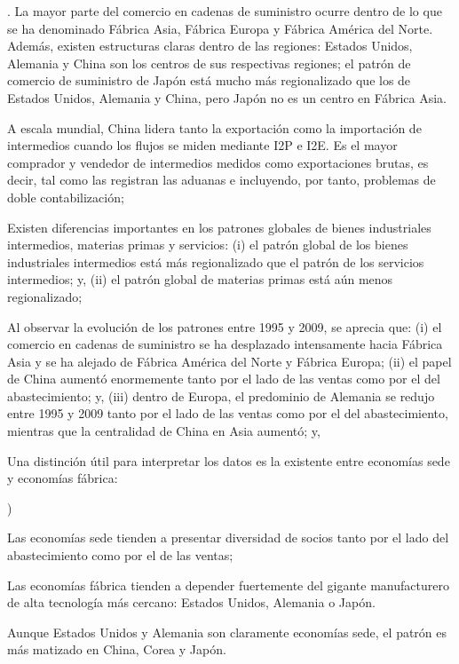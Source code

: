 \documentclass[10pt,a4paper]{article}
\newcounter{alphaitem}
\newcounter{numitem}
\newenvironment{la}
      {\begin{list}{\alph{alphaitem})}{%
          \usecounter{alphaitem}%
          \setlength{\leftmargin}{1cm}%
          \setlength{\parskip}{3pt}%
          \setlength{\itemsep}{0pt}%
          \setlength{\parsep}{0pt}%
      }}
      {\end{list}}
\newenvironment{lnum}
      {\begin{list}{\arabic{numitem}.}{%
          \usecounter{numitem}%
          \setlength{\leftmargin}{1cm}%
          \setlength{\parskip}{3pt}%
          \setlength{\itemsep}{0pt}%
          \setlength{\parsep}{0pt}%
      }}
      {\end{list}}
\begin{document}
\begin{lnum}
{        La mayor parte del comercio en cadenas de suministro ocurre dentro de lo que se ha denominado Fábrica Asia, Fábrica Europa y Fábrica América del Norte. Además, existen estructuras claras dentro de las regiones: Estados Unidos, Alemania y China son los centros de sus respectivas regiones; el patrón de comercio de suministro de Japón está mucho más regionalizado que los de Estados Unidos, Alemania y China, pero Japón no es un centro en Fábrica Asia.
    }
    \item A escala mundial, China lidera tanto la exportación como la importación de intermedios cuando los flujos se miden mediante I2P e I2E. Es el mayor comprador y vendedor de intermedios medidos como exportaciones brutas, es decir, tal como las registran las aduanas e incluyendo, por tanto, problemas de doble contabilización;
    \item Existen diferencias importantes en los patrones globales de bienes industriales intermedios, materias primas y servicios: (i) el patrón global de los bienes industriales intermedios está más regionalizado que el patrón de los servicios intermedios; y, (ii) el patrón global de materias primas está aún menos regionalizado;
    \item Al observar la evolución de los patrones entre 1995 y 2009, se aprecia que: (i) el comercio en cadenas de suministro se ha desplazado intensamente hacia Fábrica Asia y se ha alejado de Fábrica América del Norte y Fábrica Europa; (ii) el papel de China aumentó enormemente tanto por el lado de las ventas como por el del abastecimiento; y, (iii) dentro de Europa, el predominio de Alemania se redujo entre 1995 y 2009 tanto por el lado de las ventas como por el del abastecimiento, mientras que la centralidad de China en Asia aumentó; y,
    \item Una distinción útil para interpretar los datos es la existente entre economías sede y economías fábrica: 
    \begin{la}
        \item Las economías sede tienden a presentar diversidad de socios tanto por el lado del abastecimiento como por el de las ventas;
        \item Las economías fábrica tienden a depender fuertemente del gigante manufacturero de alta tecnología más cercano: Estados Unidos, Alemania o Japón.
    \end{la}
    Aunque Estados Unidos y Alemania son claramente economías sede, el patrón es más matizado en China, Corea y Japón.
\end{lnum}
\end{document}
